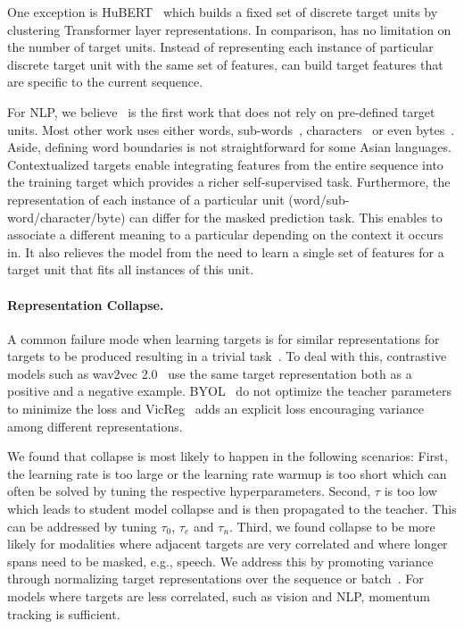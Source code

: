 \documentclass[nohyperref]{article}
\theoremstyle{plain}
\theoremstyle{definition}
\theoremstyle{remark}
\begin{document}
One exception is HuBERT~\citep{hsu2020hubert} which builds a fixed set of discrete target units by clustering Transformer layer representations.
In comparison, \name{} has no limitation on the number of target units.
Instead of representing each instance of particular discrete target unit with the same set of features, \name{} can build target features that are specific to the current sequence.

For NLP, we believe~\name{} is the first work that does not rely on pre-defined target units.
Most other work uses either words, sub-words~\citep{radford2018unsup,devlin2018bert}, characters~\citep{tay2021charformer} or even bytes~\citep{xue2021byt5}.
Aside, defining word boundaries is not straightforward for some  Asian languages.
Contextualized targets enable integrating features from the entire sequence into the training target which provides a richer self-supervised task. 
Furthermore, the representation of each instance of a particular unit (word/sub-word/character/byte) can differ for the masked prediction task.
This enables to associate a different meaning to a particular depending on the context it occurs in.
It also relieves the model from the need to learn a single set of features for a target unit that fits all instances of this unit.

\paragraph{Representation Collapse.}
A common failure mode when learning targets is for similar representations for targets to be produced resulting in a trivial task~\citep{jing2021understanding}.
To deal with this, contrastive models such as wav2vec 2.0~\citep{baevski2020wav} use the same target representation both as a positive and a negative example.
BYOL~\citep{grill2020byol} do not optimize the teacher parameters to minimize the loss and VicReg~\citep{bardes2021vicreg} adds an explicit loss encouraging variance among different representations.

We found that collapse is most likely to happen in the following scenarios: 
First, the learning rate is too large or the learning rate warmup is too short which can often be solved by tuning the respective hyperparameters.
Second, $\tau$ is too low which leads to student model collapse and is then propagated to the teacher. 
This can be addressed by tuning $\tau_0$, $\tau_e$ and $\tau_n$.
Third, we found collapse to be more likely for modalities where adjacent targets are very correlated and where longer spans need to be masked, e.g., speech.
We address this by promoting variance through normalizing target representations over the sequence or batch~\citep{grill2020byol}.
For models where targets are less correlated, such as vision and NLP, momentum tracking is sufficient. %
\end{document}
